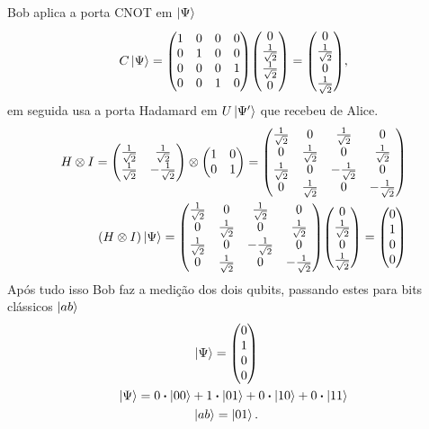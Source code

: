 \documentclass[a4paper, 12pt, oneside]{book}
\begin{document}
Bob aplica a porta CNOT em $\ket{\Psi}$
\begin{align*}
C\ket{\Psi} = \mqty(1&0&0&0\\0&1&0&0\\0&0&0&1\\0&0&1&0) 
			\mqty(0\\ \frac{1}{\sqrt{2}}\\ \frac{1}{\sqrt{2}}\\0)
		= \mqty(0\\ \frac{1}{\sqrt{2}}\\ 0\\ \frac{1}{\sqrt{2}}),
\end{align*}
em seguida usa a porta Hadamard em $U\ket{\Psi'}$ que recebeu de Alice.
\begin{align*}
H \otimes I = \mqty(\frac{1}{\sqrt{2}}&\frac{1}{\sqrt{2}}\\
				\frac{1}{\sqrt{2}}&-\frac{1}{\sqrt{2}} ) 
	\otimes \mqty(1&0\\0&1) 
= \mqty(\frac{1}{\sqrt{2}}&0&\frac{1}{\sqrt{2}}&0\\
	0&\frac{1}{\sqrt{2}}&0&\frac{1}{\sqrt{2}} \\
	\frac{1}{\sqrt{2}}&0&-\frac{1}{\sqrt{2}}&0 \\
	0&\frac{1}{\sqrt{2}}&0&-\frac{1}{\sqrt{2}}) \\
(H \otimes I)\ket{\Psi} =  \mqty(\frac{1}{\sqrt{2}}&0&\frac{1}{\sqrt{2}}&0\\
	0&\frac{1}{\sqrt{2}}&0&\frac{1}{\sqrt{2}} \\
	\frac{1}{\sqrt{2}}&0&-\frac{1}{\sqrt{2}}&0 \\
	0&\frac{1}{\sqrt{2}}&0&-\frac{1}{\sqrt{2}}) 
	\mqty(0\\ \frac{1}{\sqrt{2}}\\ 0\\ \frac{1}{\sqrt{2}}) = \mqty(0\\1\\0\\0)
\end{align*}
 Após tudo isso Bob faz a medição dos dois qubits, passando estes para bits clássicos $\ket{ab}$
\begin{align*}
\ket{\Psi} = \mqty(0\\1\\0\\0) \hspace{2.5cm} \\
\ket{\Psi} = 0\vdot\ket{00} + 1\vdot\ket{01} + 0\vdot\ket{10} + 0\vdot\ket{11} \\
\ket{ab} = \ket{01}. \hspace{2.5cm}
\end{align*}
\end{document}
